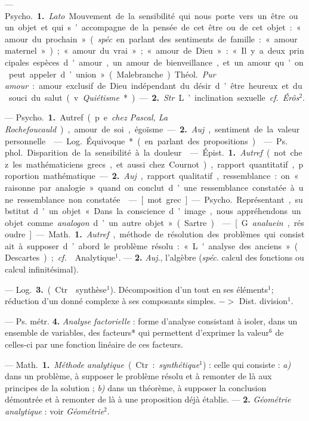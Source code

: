 \begin{itemize}[leftmargin=1cm, label=, itemsep=1pt]
{ — \si{Psycho.} {\bf 1.} {\it Lato}.
Mouvement de la sensibilité qui nous porte
vers un être ou un objet et qui s’accompagne de la pensée de cet être
ou de cet objet : « amour du prochain » ({\it spéc}. en parlant des
sentiments de famille : « amour maternel »); « amour du vrai » ; « amour de
Dieu » : « Il y a deux principales
espèces d'amour, un amour de bienveillance, et un amour qu'on peut
appeler d’union » (Malebranche).
\si{Théol.} {\it Pur amour} : amour exclusif
de Dieu indépendant du désir d’être
heureux et du souci du salut (v.
{\it Quiétisme}*). — {\bf 2.} {\it Str}. L’inclination
sexuelle. {\it cf.}  {\it Érôs}$^2$.

 — \si{Psycho.} {\bf 1.} Autref.
(p. e. {\it chez Pascal, La Rochefoucauld}),
amour de soi, égoïsme. — {\bf 2.} {\it Auj}.,
sentiment de la valeur personnelle.

 — \si{Log.} Équivoque*
(en parlant des propositions).

 — \si{Ps. phol.} Disparition
de la sensibilité à la douleur.

 — \si{Épist.} {\bf 1.} {\it Autref}. (not.
chez les mathématiciens grecs, et
aussi chez Cournot), rapport quantitatif, proportion mathématique. —
 {\bf 2.} {\it Auj}., rapport qualitatif, ressemblance : on « raisonne par analogie »
quand on conclut d’une ressemblance constatée à une ressemblance
non constatée.

 — [mot grec] — \si{Psycho.} Représentant,
substitut d'un objet
« Dans la conscience d'image, nous
appréhendons un objet comme {\it analogon} d’un autre objet » (Sartre).

 — [G. {\it analuein}, résoudre] —
\si{Math.} {\bf 1.} {\it Autref}., méthode de résolution des problèmes qui consistait
à supposer d’abord le problème résolu : « L'analyse des anciens »
(Descartes) ; {\it cf.}  {\it }Analytique$^1$. — {\bf 2.}
{\it Auj}., l'algèbre ({\it spéc}. calcul des fonctions ou calcul infinitésimal).

— \si{Log.} {\bf 3.} (Ctr. {\it }synthèse$^1$).
Décomposition d’un tout en ses éléments$^1$; réduction d'un donné
complexe à ses composants simples. $->$ Dist. division$^1$.

— Ps. métr. {\bf 4.} {\it Analyse factorielle} : forme d'analyse consistant à
isoler, dans un ensemble de variables,
des facteurs* qui permettent d’exprimer la valeur$^6$ de celles-ci par une
fonction linéaire de ces facteurs.

 — \si{Math.} {\bf 1.} {\it Méthode analytique} (Ctr. : {\it synthétique}$^1$) : celle
qui consiste : {\it a)} dans un problème,
à supposer le problème résolu et à
remonter de là aux principes de la
solution ; {\it b)} dans un théorème, à
supposer la conclusion démontrée et
à remonter de là à une proposition
déjà établie. — {\bf 2.} {\it Géométrie analytique} : voir {\it Géométrie}$^2$.

}
\end{itemize}
